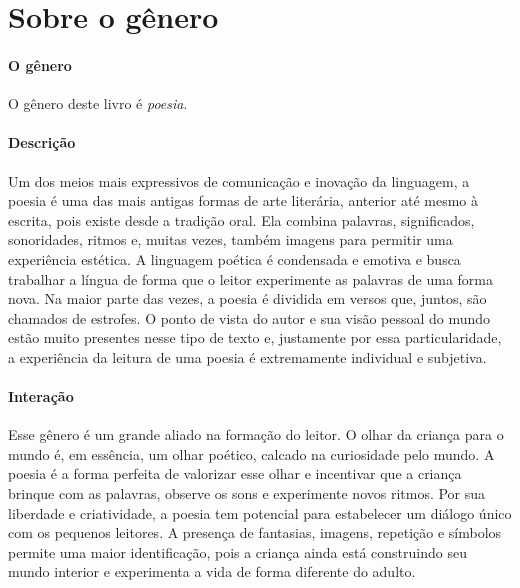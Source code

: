 \documentclass[11pt]{extarticle}
\begin{document}
\section{Sobre o gênero}


\paragraph{O gênero} O gênero deste livro é \textit{poesia}. 


\paragraph{Descrição} Um dos meios mais expressivos de comunicação e inovação da linguagem, a poesia é uma das mais antigas formas de arte literária, anterior até mesmo à escrita, pois existe desde a tradição oral. Ela combina palavras, significados, sonoridades, ritmos e, muitas vezes, também imagens para permitir uma experiência estética. A linguagem poética é condensada e emotiva e busca trabalhar a língua de forma que o leitor experimente as palavras de uma forma nova. Na maior parte das vezes, a poesia é dividida em versos que, juntos, são chamados de estrofes. O ponto de vista do autor e sua visão pessoal do mundo estão muito presentes nesse tipo de texto e, justamente por essa particularidade, a experiência da leitura de uma poesia é extremamente individual e subjetiva.

\paragraph{Interação} Esse gênero é um grande aliado na formação do leitor. O olhar da criança para o mundo é, em essência, um olhar poético, calcado na curiosidade pelo mundo. A poesia é a forma perfeita de valorizar esse olhar e incentivar que a criança brinque com as palavras, observe os sons e experimente novos ritmos. Por sua liberdade e criatividade, a poesia tem potencial para estabelecer um diálogo único com os pequenos leitores. A presença de fantasias, imagens, repetição e símbolos permite uma maior identificação, pois a criança ainda está construindo seu mundo interior e experimenta a vida de forma diferente do adulto. 
\end{document}
